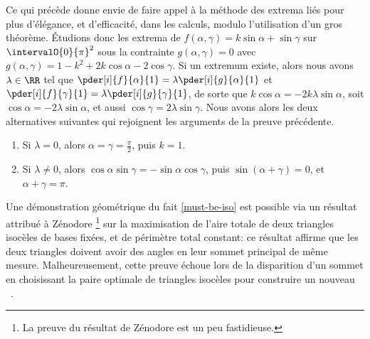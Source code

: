\begin{remark}
    Ce qui précède donne envie de faire appel à la méthode des extrema liés pour plus d'élégance, et d'efficacité, dans les calculs, modulo l'utilisation d'un gros théorème.
    Étudions donc les extrema de
	$f(\alpha , \gamma) = k \sin \alpha + \sin \gamma$
	sur $\intervalO{0}{\pi}^2$ sous la contrainte
	$g(\alpha , \gamma) = 0$
	avec
	$g(\alpha , \gamma) = 1 - k^2 + 2 k \cos \alpha - 2 \cos \gamma$.
    Si un extremum existe, alors nous avons $\lambda \in \RR$ tel que
    $\pder[i]{f}{\alpha}{1} = \lambda \pder[i]{g}{\alpha}{1}$
	et
    $\pder[i]{f}{\gamma}{1} = \lambda \pder[i]{g}{\gamma}{1}$,
	de sorte que
	$k \cos \alpha = - 2 k \lambda \sin \alpha$,
	soit
	$\cos \alpha = - 2 \lambda \sin \alpha$,
	et aussi
	$\cos \gamma = 2 \lambda \sin \gamma$.
	Nous avons alors les deux alternatives suivantes qui rejoignent les arguments de la preuve précédente.
	\begin{enumerate}
	    \item Si $\lambda = 0$,
	    alors
	    $\alpha = \gamma = \frac{\pi}{2}$, puis $k = 1$. 

	    \item Si $\lambda \neq 0$,
	    alors
	    $\cos \alpha \sin \gamma = - \sin \alpha \cos \gamma$,
	    puis
	    $\sin (\alpha + \gamma) = 0$,
	    et
	    $\alpha + \gamma = \pi$.
	\end{enumerate}
\end{remark}


%    


\begin{remark}
	Une démonstration géométrique du fait \ref{must-be-iso} est possible via un résultat attribué à Zénodore%
	\footnote{
	    La preuve du résultat de Zénodore est un peu fastidieuse.
	}
	sur la maximisation de l'aire totale de deux triangles isocèles de bases fixées, et de périmètre total constant:
	ce résultat affirme que les deux triangles doivent avoir des angles en leur sommet principal de même mesure.
	Malheureusement, cette preuve échoue lors de la disparition d'un sommet en choisissant la paire optimale de triangles isocèles pour construire un nouveau \ngone\ .
\end{remark}


